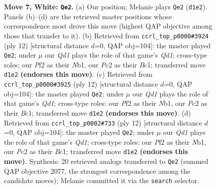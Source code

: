 \documentclass[11pt]{article}
\begin{document}
\begin{figure}[p]
\caption{\textbf{Move 7, White: \texttt{Qe2}.} (a) Our position; Melanie plays \texttt{Qe2} (\texttt{d1e2}). Panels (b)--(d) are the retrieved master positions whose correspondence most drove this move (highest QAP objective among those that transfer to it). (b) Retrieved from \texttt{ccrl\_top\_p0000\#3924} (ply 12) [structural distance $d$=0, QAP obj=104]: the master played \texttt{Qe2}; under $\mu$ our \emph{Qd1} plays the role of that game's \emph{Qd1}; cross-type roles: our \emph{P}f2 as their \emph{N}b1, our \emph{P}c2 as their \emph{B}c1; transferred move \texttt{d1e2} \textbf{(endorses this move)}. (c) Retrieved from \texttt{ccrl\_top\_p0000\#3925} (ply 12) [structural distance $d$=0, QAP obj=104]: the master played \texttt{Qe2}; under $\mu$ our \emph{Qd1} plays the role of that game's \emph{Qd1}; cross-type roles: our \emph{P}f2 as their \emph{N}b1, our \emph{P}c2 as their \emph{B}c1; transferred move \texttt{d1e2} \textbf{(endorses this move)}. (d) Retrieved from \texttt{ccrl\_top\_p0002\#733} (ply 12) [structural distance $d$=0, QAP obj=104]: the master played \texttt{Qe2}; under $\mu$ our \emph{Qd1} plays the role of that game's \emph{Qd1}; cross-type roles: our \emph{P}f2 as their \emph{N}b1, our \emph{P}c2 as their \emph{B}c1; transferred move \texttt{d1e2} \textbf{(endorses this move)}. Synthesis: 20 retrieved analogs transferred to \texttt{Qe2} (summed QAP objective 2077, the strongest correspondence among the candidate moves); Melanie committed it via the \texttt{search} selector.}
\label{fig:thought-m12}
\end{figure}

\clearpage
\end{document}

